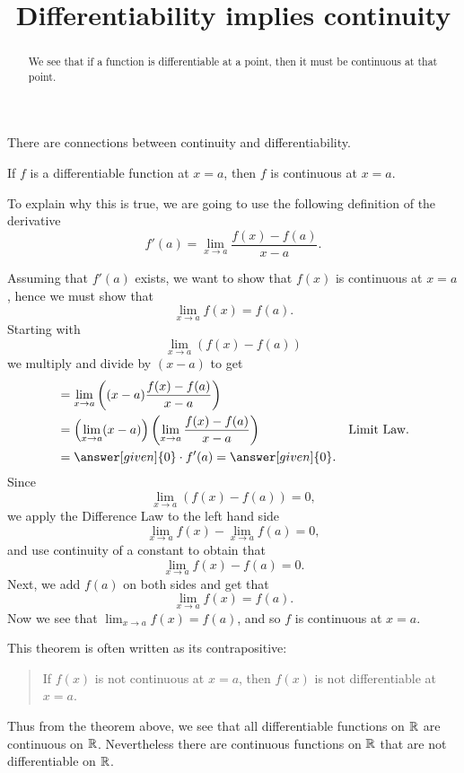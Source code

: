 \documentclass{ximera}
\title[Dig-In:]{Differentiability implies continuity}
\begin{document}
\begin{abstract}
We see that if a function is differentiable at a point, then it must
be continuous at that point.
\end{abstract}
\maketitle

There are connections between continuity and differentiability.

\begin{theorem}
If $f$ is a differentiable function at $x = a$, then $f$ is continuous
at $x=a$.
\begin{explanation}
To explain why this is true, we are going to use the following
definition of the derivative
\[
f'(a) = \lim_{x\to a} \frac{f(x)-f(a)}{x-a}.
\]

  Assuming that $f'(a)$ exists, we want to show that $f(x)$ is
continuous at $x=a$, hence we must show that
\[
\lim_{x\to a} f(x) = f(a).
\]
Starting with
\[
\lim_{x\to a} \left(f(x) - f(a)\right)
\]
we multiply and divide by $(x-a)$ to get
\begin{align*}
  &= \lim_{x\to a} \left((x-a)\frac{f(x) - f(a)}{x-a}\right) \\
  &= \left(\lim_{x\to a} (x-a) \right) \left(\lim_{x\to a}\frac{f(x) - f(a)}{x-a}\right) &\text{Limit Law.} \\
  &= \answer[given]{0}\cdot f'(a) = \answer[given]{0}.
\end{align*}
Since 
\[
\lim_{x\to a}\left(f(x) - f(a)\right) = 0 ,
\]
we apply the Difference Law to the left hand side
\[
\lim_{x\to a}f(x) - \lim_{x\to a}f(a) = 0 ,
\]
and use continuity of a constant to obtain that
\[
\lim_{x\to a}f(x) - f(a) = 0 .
\]
Next, we add $f(a)$ on both sides and get that
\[
\lim_{x\to a}f(x) = f(a).
\]
Now we see that $\lim_{x\to a} f(x) = f(a)$, and so $f$ is continuous at
$x=a$.
\end{explanation}
\end{theorem}

This theorem is often written as its contrapositive:
\begin{quote}
If $f(x)$ is not continuous at $x=a$, then $f(x)$ is not
differentiable at $x=a$.
\end{quote}


Thus from the theorem above, we see that all differentiable functions
on $\mathbb R$ are continuous on $\mathbb R$. Nevertheless there are continuous
functions on $\mathbb R$ that are not differentiable on $\mathbb R$.
\end{document}
